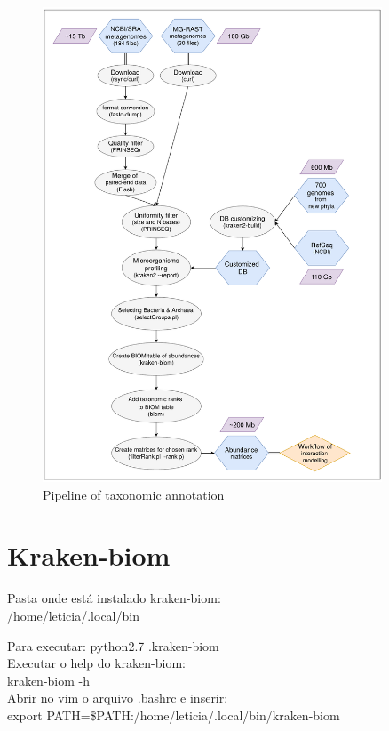 \documentclass[12pt, a4paper]{report}
\begin{document}
\begin{figure}
  \centering 
  \includegraphics[width=0.9\textwidth]{figures/workflow-aquifers-reviewed_03-09-18.pdf}
  \caption{Pipeline of taxonomic annotation} 
  \end{figure}

\section{Kraken-biom}
Pasta onde está instalado kraken-biom: \\
/home/leticia/.local/bin

Para executar:
python2.7 .\/kraken-biom \\

Executar o help do kraken-biom: \\
kraken-biom -h \\

Abrir no vim o arquivo .bashrc e inserir: \\
export PATH=\$PATH:/home/leticia/.local/bin/kraken-biom \\
\end{document}

